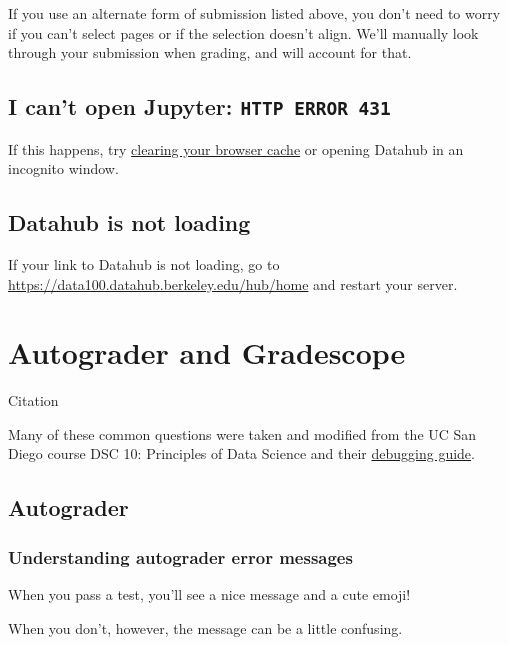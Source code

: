 \documentclass[
  letterpaper,
  DIV=11,
  numbers=noendperiod]{scrreprt}
\begin{document}
If you use an alternate form of submission listed above, you don't need
to worry if you can't select pages or if the selection doesn't align.
We'll manually look through your submission when grading, and will
account for that.

\section{\texorpdfstring{I can't open Jupyter:
\texttt{HTTP\ ERROR\ 431}}{I can't open Jupyter: HTTP ERROR 431}}\label{i-cant-open-jupyter-http-error-431}

If this happens, try
\href{https://support.google.com/accounts/answer/32050?hl=en&co=GENIE.Platform\%3DDesktop}{clearing
your browser cache} or opening Datahub in an incognito window.

\section{Datahub is not loading}\label{datahub-is-not-loading}

If your link to Datahub is not loading, go to
\url{https://data100.datahub.berkeley.edu/hub/home} and restart your
server.


\chapter{Autograder and Gradescope}\label{autograder-and-gradescope}

Citation

Many of these common questions were taken and modified from the UC San
Diego course DSC 10: Principles of Data Science and their
\href{https://dsc10.com/debugging/}{debugging guide}.

\section{Autograder}\label{autograder}

\subsection{Understanding autograder error
messages}\label{understanding-autograder-error-messages}

When you pass a test, you'll see a nice message and a cute emoji!

When you don't, however, the message can be a little confusing.
\end{document}
